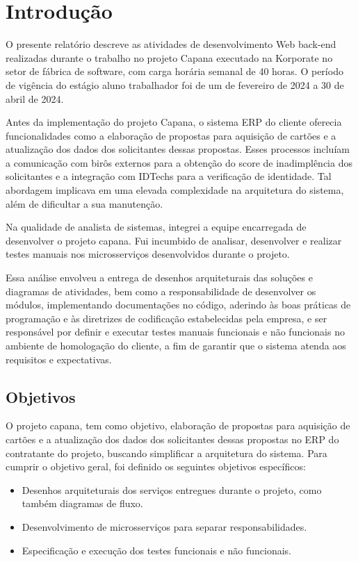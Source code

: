 \chapter{Introdução}
\label{Introdução}

O presente relatório descreve as atividades de desenvolvimento Web back-end 
realizadas durante o trabalho no projeto Capana executado na Korporate no setor de 
fábrica de software, com carga horária semanal de 40 horas. O período de vigência 
do estágio aluno trabalhador foi de um de fevereiro de 2024 a 30 de abril de 2024.

Antes da implementação do projeto Capana, o sistema ERP do cliente oferecia 
funcionalidades como a elaboração de propostas para aquisição de cartões e a 
atualização dos dados dos solicitantes dessas propostas. Esses processos 
incluíam a comunicação com birôs externos para a obtenção do score de inadimplência 
dos solicitantes e a integração com IDTechs para a verificação de identidade. 
Tal abordagem implicava em uma elevada complexidade na arquitetura do sistema, 
além de dificultar a sua manutenção. 

Na qualidade de analista de sistemas, integrei a equipe encarregada de desenvolver 
o projeto capana. Fui incumbido de analisar, desenvolver e realizar testes 
manuais nos microsserviços desenvolvidos durante o projeto. 

Essa análise envolveu a entrega de desenhos arquiteturais das soluções e diagramas 
de atividades, bem como a responsabilidade de desenvolver os módulos, 
implementando documentações no código, aderindo às boas práticas de programação e 
às diretrizes de codificação estabelecidas pela empresa, e ser responsável por 
definir e executar testes manuais funcionais e não funcionais no ambiente de 
homologação do cliente, a fim de garantir que o sistema atenda aos requisitos e 
expectativas.				

\section{Objetivos}

O projeto capana, tem como objetivo, elaboração de propostas para aquisição de 
cartões e a atualização dos dados dos solicitantes dessas propostas no ERP do 
contratante do projeto, buscando simplificar a arquitetura do 
sistema. Para cumprir o objetivo geral, foi definido os seguintes objetivos 
específicos:

\begin{itemize}

    \item Desenhos arquiteturais dos serviços entregues durante o projeto, como 
    também diagramas de fluxo.
    \item Desenvolvimento de microsserviços para separar responsabilidades.
    \item Especificação e execução dos testes funcionais e não funcionais.

\end{itemize}

